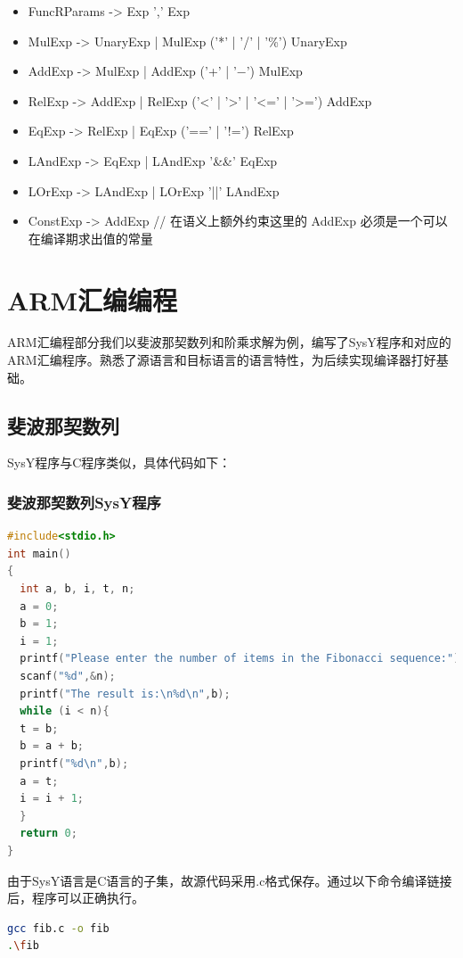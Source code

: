 \documentclass[UTF8,a4paper,10pt]{ctexart}
\begin{document}
\begin{itemize}
  \item FuncRParams  -> Exp { ',' Exp }
  \item MulExp       -> UnaryExp
                | MulExp ('*' | '/' | '\%') UnaryExp
  \item AddExp       -> MulExp
                | AddExp ('+' | '−') MulExp
  \item RelExp       -> AddExp
                | RelExp ('<' | '>' | '<=' | '>=') AddExp
  \item EqExp        -> RelExp
                | EqExp ('==' | '!=') RelExp
  \item LAndExp      -> EqExp
                | LAndExp '\&\&' EqExp
  \item LOrExp       -> LAndExp
                | LOrExp '||' LAndExp
  \item ConstExp     -> AddExp  // 在语义上额外约束这里的 AddExp 必须是一个可以在编译期求出值的常量
\end{itemize}

\section{ARM汇编编程}
ARM汇编程部分我们以斐波那契数列和阶乘求解为例，编写了SysY程序和对应的ARM汇编程序。熟悉了源语言和目标语言的语言特性，为后续实现编译器打好基础。
\subsection{斐波那契数列}
SysY程序与C程序类似，具体代码如下：
\subsubsection{斐波那契数列SysY程序}
\begin{lstlisting}[title=斐波那契数列SysY程序,frame=trbl,language={C}]
#include<stdio.h>
int main()
{
  int a, b, i, t, n; 
  a = 0;
  b = 1;
  i = 1;
  printf("Please enter the number of items in the Fibonacci sequence:");
  scanf("%d",&n);
  printf("The result is:\n%d\n",b);
  while (i < n){
  t = b;
  b = a + b;
  printf("%d\n",b);
  a = t;
  i = i + 1;
  }
  return 0;
}
\end{lstlisting}
由于SysY语言是C语言的子集，故源代码采用.c格式保存。通过以下命令编译链接后，程序可以正确执行。
\begin{lstlisting}[frame=trbl,language=sh]
gcc fib.c -o fib
.\fib
\end{lstlisting}
\end{document}

